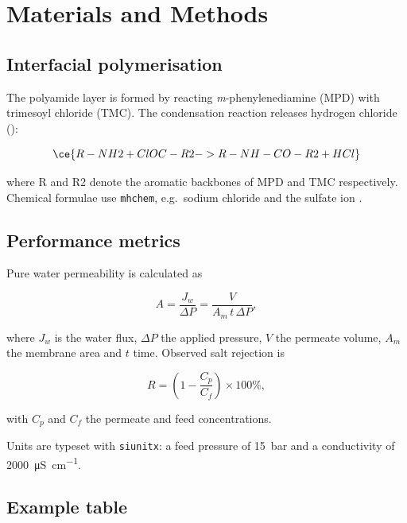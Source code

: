 \chapter{Materials and Methods}
\label{ch:methods}

\section{Interfacial polymerisation}

The polyamide layer is formed by reacting \emph{m}-phenylenediamine (MPD) with
trimesoyl chloride (TMC). The condensation reaction releases hydrogen chloride
():

\begin{equation}
  \ce{R-NH2 + ClOC-R2 -> R-NH-CO-R2 + HCl}
  \label{eq:ip}
\end{equation}

where R and R2 denote the aromatic backbones of MPD and TMC respectively.
Chemical formulae use \texttt{mhchem}, e.g.\ sodium chloride  and
the sulfate ion .

\section{Performance metrics}

Pure water permeability is calculated as

\begin{equation}
  A = \frac{J_w}{\Delta P} = \frac{V}{A_m \, t \, \Delta P},
  \label{eq:pwp}
\end{equation}

\noindent where $J_w$ is the water flux, $\Delta P$ the applied pressure,
$V$ the permeate volume, $A_m$ the membrane area and $t$ time. Observed salt
rejection is

\begin{equation}
  R = \left(1 - \frac{C_p}{C_f}\right) \times 100\%,
  \label{eq:rejection}
\end{equation}

\noindent with $C_p$ and $C_f$ the permeate and feed concentrations.

Units are typeset with \texttt{siunitx}: a feed pressure of
\SI{15}{\bar} and a conductivity of \SI{2000}{\micro\siemens\per\centi\metre}.

\section{Example table}


